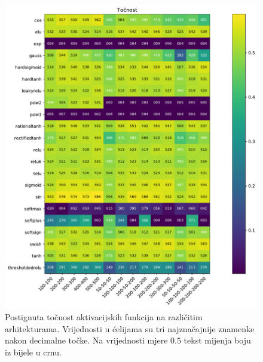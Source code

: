 \documentclass[times, utf8, numeric, diplomski]{fer}
\begin{document}
\begin{figure}[ht]
\includegraphics[width=\textwidth]{greedy_256_acc.pdf}
\centering
\caption{Postignuta točnost aktivacijskih funkcija na različitim arhitekturama. Vrijednosti u ćelijama su tri najznačajnije znamenke nakon decimalne točke. Na vrijednosti mjere $0.5$ tekst mijenja boju iz bijele u crnu.}
\label{fig:greedy_256_acc}
\end{figure}
\end{document}
